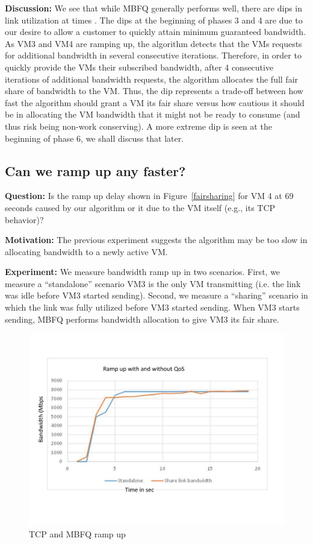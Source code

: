 {\bf Discussion:} We see that while MBFQ generally performs well, there are dips
in link utilization at times . The dips at the beginning of phases 3
and 4 are due to our desire to allow a customer to quickly attain minimum
guaranteed bandwidth. As VM3 and VM4 are ramping up, the algorithm detects that
the VMs requests for additional bandwidth in several consecutive iterations.
Therefore, in order to quickly provide the VMs their subscribed bandwidth, after
4 consecutive iterations of additional bandwidth requests, the algorithm
allocates the full fair share of bandwidth to the VM.  Thus, the dip represents a trade-off between how fast the
algorithm should grant a VM its fair share versus how cautious it should be in
allocating the VM bandwidth that it might not be ready to consume (and thus risk
being non-work conserving). A more extreme dip is seen at the
beginning of phase 6, we shall discuss that later.

\subsection{Can we ramp up any faster?}

{\bf Question:}  Is the ramp up delay shown in Figure~\ref{fairsharing} for VM 4
at 69 seconds caused by our algorithm or it due to the VM itself (e.g., its TCP
behavior)?

{\bf Motivation:} The previous experiment suggests the algorithm may be too slow
in allocating bandwidth to a newly active VM.  

{\bf Experiment:} We measure bandwidth ramp up in two scenarios.  First, we
measure a  ``standalone'' scenario VM3 is the only VM transmitting (i.e. the link
was idle before VM3 started sending).  Second, we measure a  ``sharing'' scenario
in which the link was fully utilized before VM3 started sending. When VM3 starts
sending, MBFQ performs bandwidth allocation to give VM3 its fair share.

\begin{figure}[h]
\centering
\includegraphics[width=0.7\columnwidth,trim=60pt 40mm 0pt 8mm]{figures/rampupcomparison}
\caption{TCP and MBFQ ramp up}
\label{rampupcomparison}
\vspace{-3mm}
\end{figure}

